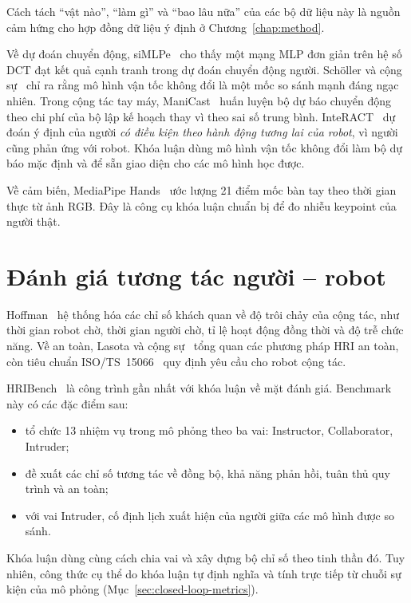 Cách tách ``vật nào'', ``làm gì'' và ``bao lâu nữa'' của các bộ dữ liệu này là nguồn cảm hứng cho hợp đồng dữ liệu ý định ở Chương~\ref{chap:method}.

Về dự đoán chuyển động, siMLPe~\cite{guo2023simlpe} cho thấy một mạng MLP đơn giản trên hệ số DCT đạt kết quả cạnh tranh trong dự đoán chuyển động người. Schöller và cộng sự~\cite{scholler2020cvm} chỉ ra rằng mô hình vận tốc không đổi là một mốc so sánh mạnh đáng ngạc nhiên. Trong cộng tác tay máy, ManiCast~\cite{kedia2023manicast} huấn luyện bộ dự báo chuyển động theo chi phí của bộ lập kế hoạch thay vì theo sai số trung bình. InteRACT~\cite{kedia2024interact} dự đoán ý định của người \emph{có điều kiện theo hành động tương lai của robot}, vì người cũng phản ứng với robot. Khóa luận dùng mô hình vận tốc không đổi làm bộ dự báo mặc định và để sẵn giao diện cho các mô hình học được.

Về cảm biến, MediaPipe Hands~\cite{zhang2020mediapipe} ước lượng 21 điểm mốc bàn tay theo thời gian thực từ ảnh RGB. Đây là công cụ khóa luận chuẩn bị để đo nhiễu keypoint của người thật.

\section{Đánh giá tương tác người -- robot}
\label{sec:related-eval}

Hoffman~\cite{hoffman2019fluency} hệ thống hóa các chỉ số khách quan về độ trôi chảy của cộng tác, như thời gian robot chờ, thời gian người chờ, tỉ lệ hoạt động đồng thời và độ trễ chức năng. Về an toàn, Lasota và cộng sự~\cite{lasota2017survey} tổng quan các phương pháp HRI an toàn, còn tiêu chuẩn ISO/TS~15066~\cite{iso15066} quy định yêu cầu cho robot cộng tác.

HRIBench~\cite{liu2026hribench} là công trình gần nhất với khóa luận về mặt đánh giá. Benchmark này có các đặc điểm sau:
\begin{itemize}
  \item tổ chức 13 nhiệm vụ trong mô phỏng theo ba vai: Instructor, Collaborator, Intruder;
  \item đề xuất các chỉ số tương tác về đồng bộ, khả năng phản hồi, tuân thủ quy trình và an toàn;
  \item với vai Intruder, cố định lịch xuất hiện của người giữa các mô hình được so sánh.
\end{itemize}
Khóa luận dùng cùng cách chia vai và xây dựng bộ chỉ số theo tinh thần đó. Tuy nhiên, công thức cụ thể do khóa luận tự định nghĩa và tính trực tiếp từ chuỗi sự kiện của mô phỏng (Mục~\ref{sec:closed-loop-metrics}).

